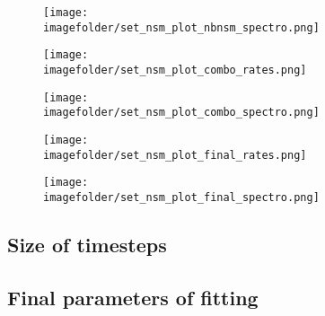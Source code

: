 \begin{figure}[h]
  \centering
  \texttt{[image: \\imagefolder/set\_nsm\_plot\_nbnsm\_spectro.png]}
  \caption{\label{fig:fit-v3-number-euro}}
\end{figure}
\begin{figure}[h]
  \centering
  \texttt{[image: \\imagefolder/set\_nsm\_plot\_combo\_rates.png]}
  \caption{\label{fig:fit-v3-combo-nsmr}}
\end{figure}
\begin{figure}[h]
  \centering
  \texttt{[image: \\imagefolder/set\_nsm\_plot\_combo\_spectro.png]}
  \caption{\label{fig:fit-v3-combo-euro}}
\end{figure}
\begin{figure}[h]
  \centering
  \texttt{[image: \\imagefolder/set\_nsm\_plot\_final\_rates.png]}
  \caption{\label{fig:fit-v3-nsmr}}
\end{figure}
\begin{figure}[h]
  \centering
  \texttt{[image: \\imagefolder/set\_nsm\_plot\_final\_spectro.png]}
  \caption{\label{fig:fit-v3-final-euro}}
\end{figure}

\FloatBarrier
\subsection{Size of timesteps}

\FloatBarrier
\subsection{Final parameters of fitting}

